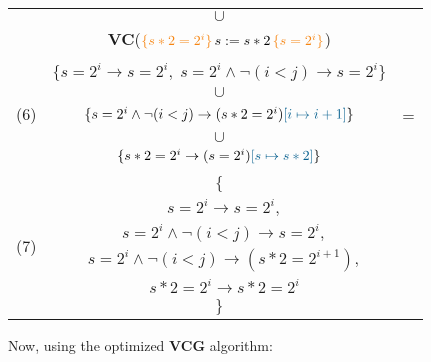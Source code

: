 \documentclass[11pt]{article}
\newcommand{\hblue}[1]{{\color{MidnightBlue}{#1}}}
\newcommand{\hoaret}[3]{{\color{BurntOrange}{\{#1\}}}\,#2\,{\color{BurntOrange}{\{#3\}}}}
\begin{document}
\begin{tabular}{lcl}
  & \multicolumn{1}{c}{$\cup$} \\
  & \textbf{VC}($\hoaret{s*2 = 2^i}{s := s*2}{s = 2^i}$)\\[2ex]\hline\\  
  \multirow{5}{*}{(6)} & $\{s = 2^i \to s = 2^i,\;s = 2^i \land \neg(i <j) \to s = 2^i\}$ \\
  & \multicolumn{1}{c}{$\cup$} \\
  & $\{s = 2^i \land \neg(i < j) \to (s*2 = 2^i)\hblue{[i \mapsto i + 1]}\}$ & =\\
  & \multicolumn{1}{c}{$\cup$} \\
  & $\{s*2 = 2^i \to (s = 2^i)\hblue{[s \mapsto s*2]}\}$\\[2ex]\hline\\
  \multirow{6}{*}{(7)} & $\{$\\
  & $\:\:\:s = 2^i \to s = 2^i,$\\
  & $\:\:\:s = 2^i \land \neg(i <j) \to s = 2^i,$ \\
  & $\:\:\:s = 2^i \land \neg(i < j) \to (s*2 = 2^{i+1}),$ \\
  & $\:\:\:s*2 = 2^i \to s*2 = 2^i$\\
  & $\}$
\end{tabular}
\newpage
Now, using the optimized \textbf{VCG} algorithm:\\
\end{document}
